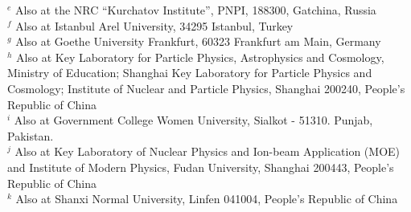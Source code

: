 \begin{small}
\begin{center}
{$^{e}$ Also at the NRC ``Kurchatov Institute'', PNPI, 188300, Gatchina, Russia\\
$^{f}$ Also at Istanbul Arel University, 34295 Istanbul, Turkey\\
$^{g}$ Also at Goethe University Frankfurt, 60323 Frankfurt am Main, Germany\\
$^{h}$ Also at Key Laboratory for Particle Physics, Astrophysics and Cosmology, Ministry of Education; Shanghai Key Laboratory for Particle Physics and Cosmology; Institute of Nuclear and Particle Physics, Shanghai 200240, People's Republic of China\\
$^{i}$ Also at Government College Women University, Sialkot - 51310. Punjab, Pakistan. \\
$^{j}$ Also at Key Laboratory of Nuclear Physics and Ion-beam Application (MOE) and Institute of Modern Physics, Fudan University, Shanghai 200443, People's Republic of China\\
$^{k}$ Also at Shanxi Normal University, Linfen 041004, People's Republic of China\\
}\end{center}

\vspace{0.4cm}
\end{small}